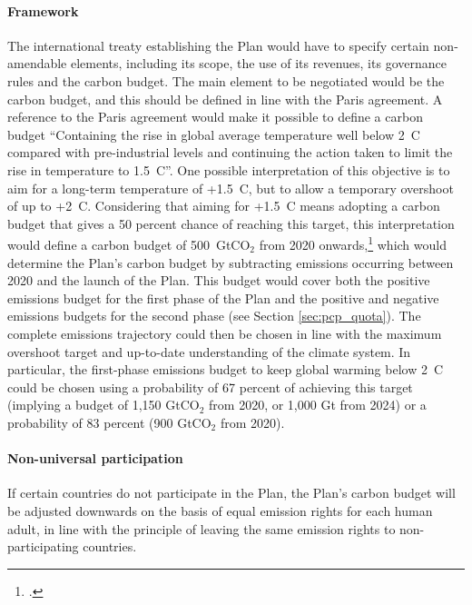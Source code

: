 \documentclass[a5paper,english,openany]{memoir}
\begin{document}
\paragraph{Framework} %
The international treaty establishing the Plan would have to specify certain non-amendable elements, including its scope, the use of its revenues, its governance rules and the carbon budget. The main element to be negotiated would be the carbon budget, and this should be defined in line with the Paris agreement. A reference to the Paris agreement would make it possible to define a carbon budget ``Containing the rise in global average temperature well below 2~\textdegree{}C compared with pre-industrial levels and continuing the action taken to limit the rise in temperature to 1.5~\textdegree{}C''. One possible interpretation of this objective is to aim for a long-term temperature of +1.5~\textdegree{}C, but to allow a temporary overshoot of up to +2~\textdegree{}C. 
Considering that aiming for +1.5~\textdegree{}C means adopting a carbon budget that gives a 50 percent chance of reaching this target, this interpretation would define a carbon budget of 500~GtCO$_\text{2}$ from 2020 onwards,\footnote{\citet{ipcc_climate_2021}.} 
which would determine the Plan's carbon budget by subtracting emissions occurring between 2020 and the launch of the Plan. This budget would cover both the positive emissions budget for the first phase of the Plan and the positive and negative emissions budgets for the second phase (see Section \ref{sec:pcp_quota}). 
The complete emissions trajectory 
could then be chosen in line with the maximum overshoot target and up-to-date understanding of the climate system. 
In particular, the first-phase emissions budget to keep global warming below 2~\textdegree{}C could be chosen using a probability of 67 percent of achieving this target (implying a budget of 1,150 GtCO$_\text{2}$ from 2020, or 1,000 Gt from 2024) or a probability of 83 percent (900 GtCO$_\text{2}$ from 2020). 

\paragraph{Non-universal participation}
If certain countries do not participate in the Plan, the Plan's carbon budget will be adjusted downwards on the basis of equal emission rights for each human adult, in line with the principle of leaving the same emission rights to non-participating countries. %
\end{document}
